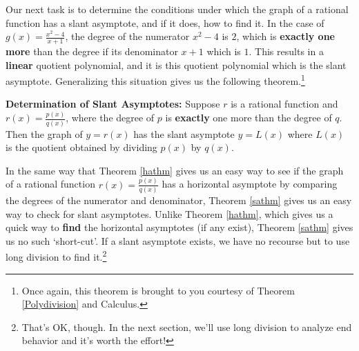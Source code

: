\medskip


Our next task is to determine the conditions under which the graph of a rational function has a slant asymptote, and if it does, how to find it.  In the case of $g(x) = \frac{x^2-4}{x+1}$, the degree of the numerator $x^2-4$ is $2$, which is \textbf{exactly one more} than the degree if its denominator $x+1$ which is $1$.  This results in a \textbf{linear} quotient polynomial, and it is this quotient polynomial which is the slant asymptote.  Generalizing this situation gives us the following theorem.\footnote{Once again, this theorem is brought to you courtesy of Theorem \ref{Polydivision} and Calculus.}

\medskip

\colorbox{ResultColor}{\bbm

\begin{thm} \textbf{Determination of Slant Asymptotes:} \label{sathm} Suppose $r$ is a rational function and $r(x) = \frac{p(x)}{q(x)}$, where the degree of $p$ is \textbf{exactly} one more than the degree of $q$.  Then the graph of $y=r(x)$ has  the slant asymptote $y=L(x)$ where $L(x)$ is the quotient obtained by dividing $p(x)$ by $q(x)$.

\end{thm}
\ebm}

\medskip

In the same way that Theorem \ref{hathm} gives us an easy way to see if the graph of a rational function $r(x) = \frac{p(x)}{q(x)}$ has a horizontal asymptote by comparing the degrees of the numerator and denominator, Theorem \ref{sathm} gives us an easy way to check for slant asymptotes.  Unlike Theorem \ref{hathm}, which gives us a quick way to \textbf{find} the horizontal asymptotes (if any exist), Theorem \ref{sathm} gives us no such `short-cut'.  If a slant asymptote exists, we have no recourse but to use long division to find it.\footnote{That's OK, though.  In the next section, we'll use long division to analyze end behavior and it's worth the effort!}  

